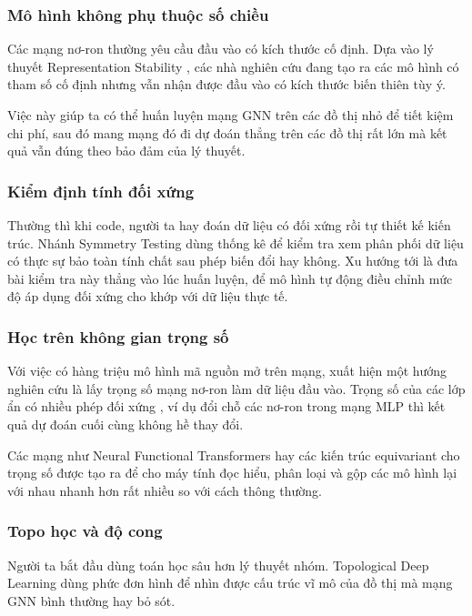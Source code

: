 \subsubsection{Mô hình không phụ thuộc số chiều }

Các mạng nơ-ron thường yêu cầu đầu vào có kích thước cố định. Dựa vào lý thuyết Representation Stability \cite{farb2014representation}, các nhà nghiên cứu đang tạo ra các mô hình có tham số cố định nhưng vẫn nhận được đầu vào có kích thước biến thiên tùy ý. 

Việc này giúp ta có thể huấn luyện mạng GNN trên các đồ thị nhỏ để tiết kiệm chi phí, sau đó mang mạng đó đi dự đoán thẳng trên các đồ thị rất lớn mà kết quả vẫn đúng theo bảo đảm của lý thuyết.

\subsubsection{Kiểm định tính đối xứng}

Thường thì khi code, người ta hay đoán dữ liệu có đối xứng rồi tự thiết kế kiến trúc. Nhánh Symmetry Testing \cite{soleymani2025symmetrytesting} dùng thống kê để kiểm tra xem phân phối dữ liệu có thực sự bảo toàn tính chất sau phép biến đổi hay không. Xu hướng tới là đưa bài kiểm tra này thẳng vào lúc huấn luyện, để mô hình tự động điều chỉnh mức độ áp dụng đối xứng cho khớp với dữ liệu thực tế.

\subsubsection{Học trên không gian trọng số }

Với việc có hàng triệu mô hình mã nguồn mở trên mạng, xuất hiện một hướng nghiên cứu là lấy trọng số mạng nơ-ron làm dữ liệu đầu vào. Trọng số của các lớp ẩn có nhiều phép đối xứng \cite{zhao2026symmetry}, ví dụ đổi chỗ các nơ-ron trong mạng MLP thì kết quả dự đoán cuối cùng không hề thay đổi. 

Các mạng như Neural Functional Transformers \cite{zhou2024neural} hay các kiến trúc equivariant cho trọng số \cite{navon2023equivariant} được tạo ra để cho máy tính đọc hiểu, phân loại và gộp các mô hình lại với nhau nhanh hơn rất nhiều so với cách thông thường.

\subsubsection{Topo học và độ cong}

Người ta bắt đầu dùng toán học sâu hơn lý thuyết nhóm. Topological Deep Learning \cite{eitan2024topological} dùng phức đơn hình để nhìn được cấu trúc vĩ mô của đồ thị mà mạng GNN bình thường hay bỏ sót. 

